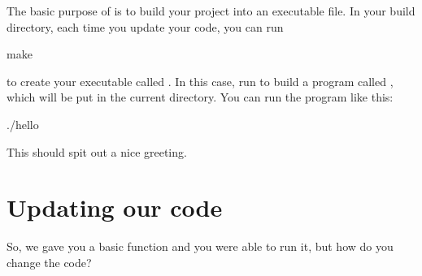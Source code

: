 \documentclass{tufte-handout}
\begin{document}




The basic purpose of  is to build your project into an
executable file. In your build directory, each time you update your
code, you can run

\begin{CmdLine*}
  \C make \\
\end{CmdLine*}

\noindent to create your executable called .  In
this case, run  to build a program called
, which will be put in the current directory. You can
run the program like this:

\begin{CmdLine*}
  \C ./hello\\
\end{CmdLine*}

\noindent
This should spit out a nice greeting.

\section{Updating our code}

So, we gave you a basic function and you were able to run it, but how do
you change the code?
\end{document}
